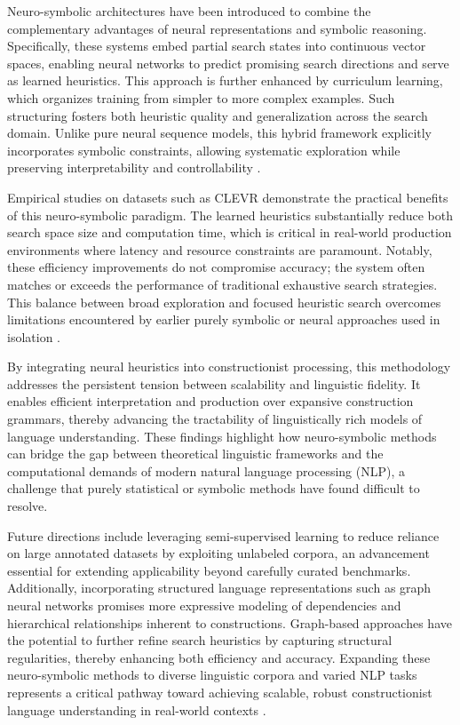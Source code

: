 \documentclass[sigconf]{acmart}
\begin{document}
Neuro-symbolic architectures have been introduced to combine the complementary advantages of neural representations and symbolic reasoning. Specifically, these systems embed partial search states into continuous vector spaces, enabling neural networks to predict promising search directions and serve as learned heuristics. This approach is further enhanced by curriculum learning, which organizes training from simpler to more complex examples. Such structuring fosters both heuristic quality and generalization across the search domain. Unlike pure neural sequence models, this hybrid framework explicitly incorporates symbolic constraints, allowing systematic exploration while preserving interpretability and controllability \cite{ref40}.

Empirical studies on datasets such as CLEVR demonstrate the practical benefits of this neuro-symbolic paradigm. The learned heuristics substantially reduce both search space size and computation time, which is critical in real-world production environments where latency and resource constraints are paramount. Notably, these efficiency improvements do not compromise accuracy; the system often matches or exceeds the performance of traditional exhaustive search strategies. This balance between broad exploration and focused heuristic search overcomes limitations encountered by earlier purely symbolic or neural approaches used in isolation \cite{ref40}.

By integrating neural heuristics into constructionist processing, this methodology addresses the persistent tension between scalability and linguistic fidelity. It enables efficient interpretation and production over expansive construction grammars, thereby advancing the tractability of linguistically rich models of language understanding. These findings highlight how neuro-symbolic methods can bridge the gap between theoretical linguistic frameworks and the computational demands of modern natural language processing (NLP), a challenge that purely statistical or symbolic methods have found difficult to resolve.

Future directions include leveraging semi-supervised learning to reduce reliance on large annotated datasets by exploiting unlabeled corpora, an advancement essential for extending applicability beyond carefully curated benchmarks. Additionally, incorporating structured language representations such as graph neural networks promises more expressive modeling of dependencies and hierarchical relationships inherent to constructions. Graph-based approaches have the potential to further refine search heuristics by capturing structural regularities, thereby enhancing both efficiency and accuracy. Expanding these neuro-symbolic methods to diverse linguistic corpora and varied NLP tasks represents a critical pathway toward achieving scalable, robust constructionist language understanding in real-world contexts \cite{ref40}.
\end{document}
